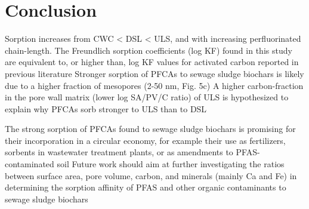 \chapter{Conclusion}\label{chap:Conclusion}

Sorption increases from CWC < DSL < ULS, and with increasing perfluorinated chain-length. The Freundlich sorption coefficients (log KF) found in this study are equivalent to, or higher than, log KF  values for activated carbon reported in previous literature
Stronger sorption of PFCAs to sewage sludge biochars is likely due to a higher fraction of mesopores (2-50 nm, Fig. 5c)
A higher carbon-fraction in the pore wall matrix (lower log SA/PV/C ratio) of ULS is hypothesized to explain why PFCAs sorb stronger to ULS than to DSL 

The strong sorption of PFCAs found to sewage sludge biochars is promising for their incorporation in a circular economy, for example their use as fertilizers, sorbents in wastewater treatment plants, or as amendments to PFAS-contaminated soil
Future work should aim at further investigating the ratios between surface area, pore volume, carbon, and minerals (mainly Ca and Fe) in determining the sorption affinity of PFAS and other organic contaminants to sewage sludge biochars






